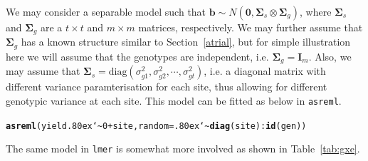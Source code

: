 \documentclass[runningheads]{llncs}\usepackage[]{graphicx}\usepackage[]{color}
\makeatletter
\newcommand{\hlnum}[1]{\textcolor[rgb]{0.686,0.059,0.569}{#1}}%
\newcommand{\hlopt}[1]{\textcolor[rgb]{0,0,0}{#1}}%
\newcommand{\hlstd}[1]{\textcolor[rgb]{0.345,0.345,0.345}{#1}}%
\newcommand{\hlkwc}[1]{\textcolor[rgb]{0.333,0.667,0.333}{#1}}%
\newcommand{\hlkwd}[1]{\textcolor[rgb]{0.737,0.353,0.396}{\textbf{#1}}}%
\newenvironment{kframe}{%
 \def\at@end@of@kframe{}%
 \ifinner\ifhmode%
  \def\at@end@of@kframe{\end{minipage}}%
  \begin{minipage}{\columnwidth}%
 \fi\fi%
 \def\FrameCommand##1{\hskip\@totalleftmargin \hskip-\fboxsep
 \colorbox{shadecolor}{##1}\hskip-\fboxsep
     \hskip-\linewidth \hskip-\@totalleftmargin \hskip\columnwidth}%
 \MakeFramed {\advance\hsize-\width
   \@totalleftmargin\z@ \linewidth\hsize
   \@setminipage}}%
 {\par\unskip\endMakeFramed%
 \at@end@of@kframe}
\newenvironment{knitrout}{}{} %
\newcommand{\mytilde}{\lower.80ex\hbox{\char`\~}}
\makeatother
\begin{document}
We may consider a separable model such that $\boldsymbol{b} \sim N(\boldsymbol{0}, \mathbf{\Sigma}_s \otimes \mathbf{\Sigma}_g)$, where $\mathbf{\Sigma}_s$ and $\mathbf{\Sigma}_g$ are a $t\times t$ and $m\times m$ matrices, respectively. We may further assume that $\mathbf{\Sigma}_g$ has a known structure similar to Section~\ref{atrial}, but for simple illustration here we will assume that the genotypes are independent, i.e. $\mathbf{\Sigma}_g = \mathbf{I}_m$. Also, we may assume that $\mathbf{\Sigma}_s = \text{diag}\left(\sigma^2_{g1}, \sigma^2_{g2}, \cdots, \sigma^2_{gt}\right)$, i.e. a diagonal matrix with different variance paramterisation for each site, thus allowing for different genotypic variance at each site. This model can be fitted as below in \texttt{asreml}.

\begin{knitrout}
	\color{fgcolor}\begin{kframe}
		\begin{alltt}
			\hlkwd{asreml}\hlstd{(yield} \hlopt{\mytilde} \hlnum{0} \hlopt{+} \hlstd{site,} \hlkwc{random} \hlstd{=} \hlopt{\mytilde} \hlkwd{diag}\hlstd{(site)}\hlopt{:}\hlkwd{id}\hlstd{(gen))}
		\end{alltt}
	\end{kframe}
\end{knitrout}

The same model in \texttt{lmer} is somewhat more involved as shown in Table~\ref{tab:gxe}. 
\end{document}
